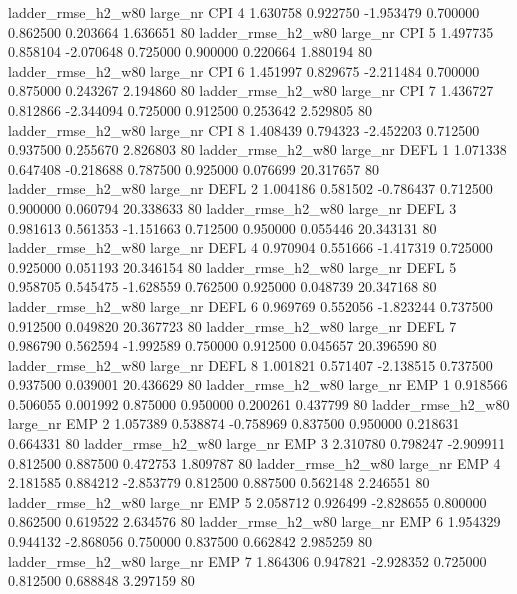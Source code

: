  ladder_rmse_h2_w80   large_nr      CPI                 4  1.630758  0.922750  -1.953479 0.700000 0.862500  0.203664    1.636651 80
 ladder_rmse_h2_w80   large_nr      CPI                 5  1.497735  0.858104  -2.070648 0.725000 0.900000  0.220664    1.880194 80
 ladder_rmse_h2_w80   large_nr      CPI                 6  1.451997  0.829675  -2.211484 0.700000 0.875000  0.243267    2.194860 80
 ladder_rmse_h2_w80   large_nr      CPI                 7  1.436727  0.812866  -2.344094 0.725000 0.912500  0.253642    2.529805 80
 ladder_rmse_h2_w80   large_nr      CPI                 8  1.408439  0.794323  -2.452203 0.712500 0.937500  0.255670    2.826803 80
 ladder_rmse_h2_w80   large_nr     DEFL                 1  1.071338  0.647408  -0.218688 0.787500 0.925000  0.076699   20.317657 80
 ladder_rmse_h2_w80   large_nr     DEFL                 2  1.004186  0.581502  -0.786437 0.712500 0.900000  0.060794   20.338633 80
 ladder_rmse_h2_w80   large_nr     DEFL                 3  0.981613  0.561353  -1.151663 0.712500 0.950000  0.055446   20.343131 80
 ladder_rmse_h2_w80   large_nr     DEFL                 4  0.970904  0.551666  -1.417319 0.725000 0.925000  0.051193   20.346154 80
 ladder_rmse_h2_w80   large_nr     DEFL                 5  0.958705  0.545475  -1.628559 0.762500 0.925000  0.048739   20.347168 80
 ladder_rmse_h2_w80   large_nr     DEFL                 6  0.969769  0.552056  -1.823244 0.737500 0.912500  0.049820   20.367723 80
 ladder_rmse_h2_w80   large_nr     DEFL                 7  0.986790  0.562594  -1.992589 0.750000 0.912500  0.045657   20.396590 80
 ladder_rmse_h2_w80   large_nr     DEFL                 8  1.001821  0.571407  -2.138515 0.737500 0.937500  0.039001   20.436629 80
 ladder_rmse_h2_w80   large_nr      EMP                 1  0.918566  0.506055   0.001992 0.875000 0.950000  0.200261    0.437799 80
 ladder_rmse_h2_w80   large_nr      EMP                 2  1.057389  0.538874  -0.758969 0.837500 0.950000  0.218631    0.664331 80
 ladder_rmse_h2_w80   large_nr      EMP                 3  2.310780  0.798247  -2.909911 0.812500 0.887500  0.472753    1.809787 80
 ladder_rmse_h2_w80   large_nr      EMP                 4  2.181585  0.884212  -2.853779 0.812500 0.887500  0.562148    2.246551 80
 ladder_rmse_h2_w80   large_nr      EMP                 5  2.058712  0.926499  -2.828655 0.800000 0.862500  0.619522    2.634576 80
 ladder_rmse_h2_w80   large_nr      EMP                 6  1.954329  0.944132  -2.868056 0.750000 0.837500  0.662842    2.985259 80
 ladder_rmse_h2_w80   large_nr      EMP                 7  1.864306  0.947821  -2.928352 0.725000 0.812500  0.688848    3.297159 80
